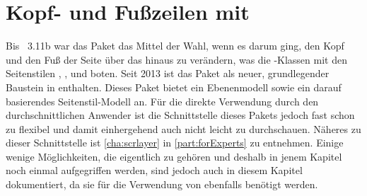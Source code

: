 \chapter[{Kopf- und Fußzeilen mit \Package{scrlayer-scrpage}}]
  {Kopf- und Fußzeilen mit
    }
%
\BeginIndexGroup
{}%
\begin{Explain}
  Bis \KOMAScript~3.11b war das Paket
   das Mittel der Wahl, wenn es darum ging, den
  Kopf und den Fuß der Seite über das hinaus zu verändern, was die
  \KOMAScript-Klassen mit den Seitenstilen ,
  ,  und  boten.
  \iffalse%
  Bis 2001 gab es dafür auch noch das Paket
  \Package{scrpage}\IndexPackage{scrpage}, das aber seit 2013 nicht mehr mit
  \KOMAScript{} zusammen verteilt wird.\par
  \fi%
  Seit 2013 ist das Paket \hyperref[cha:scrlayer]{}%
   als neuer, grundlegender Baustein in \KOMAScript{}
  enthalten. Dieses Paket bietet ein Ebenenmodell sowie ein darauf basierendes
  Seitenstil-Modell an. Für die direkte Verwendung durch den
  durchschnittlichen Anwender ist die Schnittstelle dieses Pakets jedoch fast
  schon zu flexibel und damit einhergehend auch nicht leicht zu
  durchschauen. Näheres zu dieser Schnittstelle ist \autoref{cha:scrlayer} in
  \autoref{part:forExperts} zu entnehmen. Einige wenige Möglichkeiten, die
  eigentlich zu  gehören und deshalb in jenem Kapitel noch
  einmal aufgegriffen werden, sind jedoch auch in diesem Kapitel dokumentiert,
  da sie für die Verwendung von  ebenfalls benötigt
  werden.


\end{Explain}
